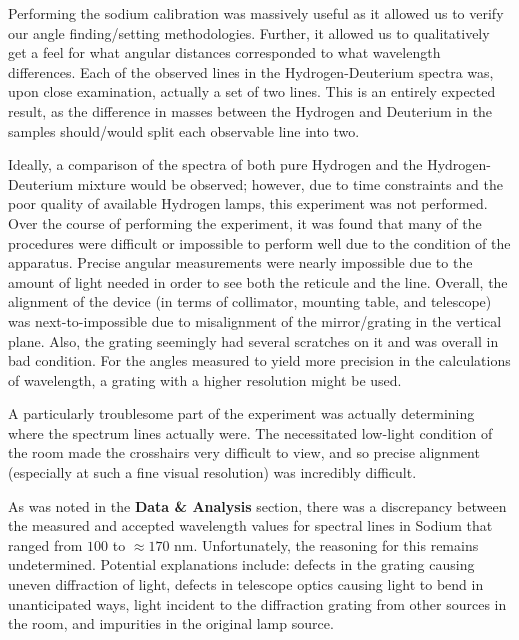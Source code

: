 \documentclass[paper=a4, fontsize=11pt]{scrartcl} %
\numberwithin{equation}{section}
\numberwithin{figure}{section}
\numberwithin{table}{section}
\begin{document}
Performing the sodium calibration was massively useful as it allowed us to verify our angle finding/setting methodologies. Further, it allowed us to qualitatively get a feel for what angular distances corresponded to what wavelength differences. Each of the observed lines in the Hydrogen-Deuterium spectra was, upon close examination, actually a set of two lines. This is an entirely expected result, as the difference in masses between the Hydrogen and Deuterium in the samples should/would split each observable line into two.

Ideally, a comparison of the spectra of both pure Hydrogen and the Hydrogen-Deuterium mixture would be observed; however, due to time constraints and the poor quality of available Hydrogen lamps, this experiment was not performed. \\


Over the course of performing the experiment, it was found that many of the procedures were difficult or impossible to perform well due to the condition of the apparatus. Precise angular measurements were nearly impossible due to the amount of light needed in order to see both the reticule and the line. Overall, the alignment of the device (in terms of collimator, mounting table, and telescope) was next-to-impossible due to misalignment of the mirror/grating in the vertical plane. Also, the grating seemingly had several scratches on it and was overall in bad condition. For the angles measured to yield more precision in the calculations of wavelength, a grating with a higher resolution might be used.

A particularly troublesome part of the experiment was actually determining where the spectrum lines actually were. The necessitated low-light condition of the room made the crosshairs very difficult to view, and so precise alignment (especially at such a fine visual resolution) was incredibly difficult.

As was noted in the \textbf{Data \& Analysis} section, there was a discrepancy between the measured and accepted wavelength values for spectral lines in Sodium that ranged from $100$ to $\approx 170$ nm. Unfortunately, the reasoning for this remains undetermined. Potential explanations include: defects in the grating causing uneven diffraction of light, defects in telescope optics causing light to bend in unanticipated ways, light incident to the diffraction grating from other sources in the room, and impurities in the original lamp source.






\end{document}
